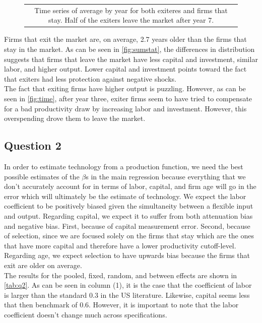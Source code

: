 \documentclass[11pt]{article}
\begin{document}
\begin{figure}[ht]
\begin{subfigure}[b]{.23\textwidth}
	\end{subfigure}
\begin{tabular*}{1\textwidth}{c}
	\multicolumn{1}{p{1\hsize}}{\footnotesize Time series of average by year for both exiteres and firms that stay. Half of the exiters leave the market after year 7.}\\
\end{tabular*}      	  
\end{figure}


Firms that exit the market are, on average, 2.7 years older than the firms that stay in the market. As can be seen in \autoref{fig:sumstat}, the differences in distribution suggests that firms that leave the market have less capital and investment, similar labor, and higher output. Lower capital and investment points toward the fact that exiters had less protection against negative shocks. \\
The fact that exiting firms have higher output is puzzling. However, as can be seen in \autoref{fig:time}, after year three, exiter firms seem to have tried to compensate for a bad productivity draw by increasing labor and investment. However, this overspending drove them to leave the market.

\newpage

\subsection*{Question 2} \label{q2}

In order to estimate technology from a production function, we need the best possible estimates of the $\beta$s in the main regression because everything that we don't accurately account for in terms of labor, capital, and firm age will go in the error which will ultimately be the estimate of technology. We expect the labor coefficient to be positively biased given the simultaneity between a flexible input and output. Regarding capital, we expect it to suffer from both attenuation bias and negative bias. First, because of capital measurement error. Second, because of selection, since we are focused solely on the firms that stay which are the ones that have more capital and therefore have a lower productivity cutoff-level. Regarding age, we expect selection to have upwards bias because the firms that exit are older on average. \\




The results for the pooled, fixed, random, and between effects are shown in \autoref{tab:q2}. As can be seen in column (1), it is the case that the coefficient of labor is larger than the standard 0.3 in the US literature. Likewise, capital seems less that then benchmark of 0.6. However, it is important to note that the labor coefficient doesn't change much across specifications. \\
\end{document}
